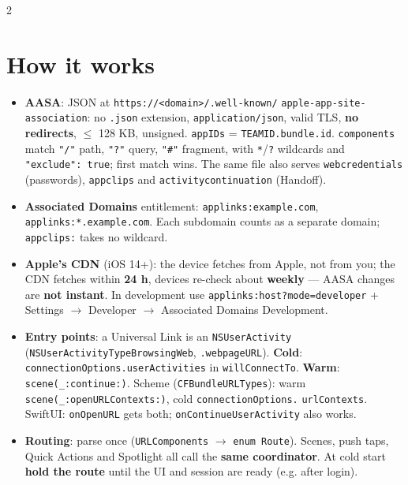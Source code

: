 \documentclass[8pt]{extarticle}
\begin{document}
\begin{multicols}{2}
\raggedright

\section{How it works}
\begin{itemize}
  \item \textbf{AASA}: JSON at \texttt{https://<domain>/.well-known/}\allowbreak
        \texttt{apple-app-site-association}: no \texttt{.json} extension,
        \texttt{application/json}, valid TLS, \textbf{no redirects},
        \(\le\) 128 KB, unsigned. \texttt{appIDs} =
        \texttt{TEAMID.bundle.id}. \texttt{components} match \texttt{"/"} path,
        \texttt{"?"} query, \texttt{"\#"} fragment, with \texttt{*}/\texttt{?}
        wildcards and \texttt{"exclude": true}; first match wins. The same file
        also serves \texttt{webcredentials} (passwords), \texttt{appclips} and
        \texttt{activitycontinuation} (Handoff).
  \item \textbf{Associated Domains} entitlement:
        \texttt{applinks:example.com}, \texttt{applinks:*.example.com}. Each
        subdomain counts as a separate domain; \texttt{appclips:} takes no wildcard.
  \item \textbf{Apple's CDN} (iOS 14+): the device fetches from Apple, not from
        you; the CDN fetches within \textbf{24 h}, devices re-check about
        \textbf{weekly} — AASA changes are \textbf{not instant}. In development use
        \texttt{applinks:host?mode=developer} + Settings $\to$ Developer $\to$
        Associated Domains Development.
  \item \textbf{Entry points}: a Universal Link is an \texttt{NSUserActivity}
        (\texttt{NSUserActivityTypeBrowsingWeb}, \texttt{.webpageURL}).
        \textbf{Cold}: \texttt{connectionOptions.}\allowbreak\texttt{userActivities}
        in \texttt{willConnectTo}. \textbf{Warm}: \texttt{scene(\_:continue:)}.
        Scheme (\texttt{CFBundleURLTypes}): warm
        \texttt{scene(\_:openURLContexts:)}, cold \texttt{connectionOptions.}\allowbreak
        \texttt{urlContexts}. SwiftUI:
        \texttt{onOpenURL} gets both; \texttt{onContinueUserActivity} also works.
  \item \textbf{Routing}: parse once (\texttt{URLComponents} $\to$
        \texttt{enum Route}). Scenes, push taps, Quick Actions and Spotlight
        all call the \textbf{same coordinator}. At cold start \textbf{hold the
        route} until the UI and session are ready (e.g. after login).
\end{itemize}


\end{multicols}
\end{document}
